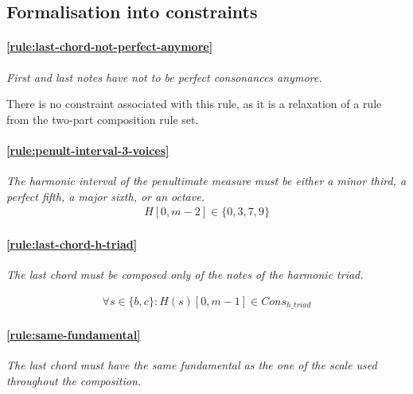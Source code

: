 \subsection{Formalisation into constraints} \label{sec:generalconstraints}
    \paragraph{\hspace{0.6cm}\ref{rule:last-chord-not-perfect-anymore}} \greendots \textit{First and last notes have not to be perfect consonances anymore.}

    There is no constraint associated with this rule, as it is a relaxation of a rule from the two-part composition rule set.

    \paragraph{\hspace{0.6cm}\ref{rule:penult-interval-3-voices}} \greendots \textit{The harmonic interval of the penultimate measure must be either a minor third, a perfect fifth, a major sixth, or an octave.}
    \begin{equation}
        \begin{aligned}
            H[0, m-2] \in \{0, 3, 7, 9\}
        \end{aligned}
    \end{equation}

    \paragraph{\hspace{0.6cm}\ref{rule:last-chord-h-triad}} \textit{The last chord must be composed only of the notes of the harmonic triad.} 
    
    \begin{equation} \begin{aligned}
    \forall s \in \{b, c\} \colon H(s)[0, m-1] \in Cons_{h\_triad}
    \end{aligned} \end{equation}

    \paragraph{\hspace{0.6cm}\ref{rule:same-fundamental}} \textit{The last chord must have the same fundamental as the one of the scale used throughout the composition.}\label{constraint:same-fundamental}


